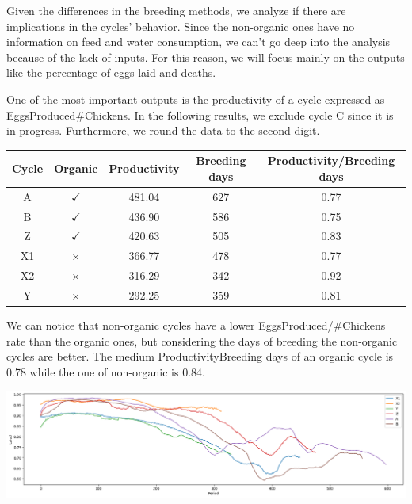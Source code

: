 \documentclass[11pt]{article}
\begin{document}
Given the differences in the breeding methods, we analyze if there are implications in the cycles' behavior. Since the non-organic ones have no information on feed and water consumption, we can't go
deep into the analysis because of the lack of inputs. For this reason, we will focus mainly on the outputs like the percentage of eggs laid and deaths.

One of the most important outputs is the productivity of a cycle expressed as EggsProduced\/\#Chickens. In the following results, we exclude cycle C since it is in progress. Furthermore, we round the 
data to the second digit.

\begin{center}
    \begin{tabular}{| c | c | c | c | c |} 
        \hline
        Cycle & Organic & Productivity & Breeding days & Productivity/Breeding days  \\ [0.5ex] 
        \hline
        A & $\checkmark$ & 481.04 & 627 & 0.77 \\ [0.5ex] 
        \hline
        B & $\checkmark$ & 436.90 & 586 &  0.75 \\ [0.5ex] 
        \hline
        Z & $\checkmark$ & 420.63 & 505 & 0.83 \\ [0.5ex] 
        \hline
        X1 & $\times$ & 366.77 & 478 & 0.77\\ [0.5ex] 
        \hline
        X2 & $\times$ & 316.29 & 342 & 0.92\\ [0.5ex] 
        \hline
        Y & $\times$ & 292.25 & 359 & 0.81 \\ [0.5ex] 
        \hline
    \end{tabular}
\end{center}

We can notice that non-organic cycles have a lower EggsProduced/\#Chickens rate than the organic ones, but considering the days of breeding the non-organic cycles are better.
The medium Productivity\/Breeding days of an organic cycle is 0.78 while the one of non-organic is 0.84.

\includegraphics[width=\linewidth]{../Results/OrganingOrNot/Laid.png}
\end{document}

